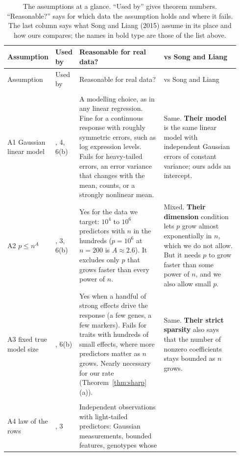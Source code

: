 \documentclass[11pt]{article}
\theoremstyle{plain}
\theoremstyle{definition}
\begin{document}
{\footnotesize\setlength{\tabcolsep}{3.5pt}\renewcommand{\arraystretch}{1.1}
\begin{longtable}{@{}>{\raggedright\arraybackslash}p{0.125\linewidth}>{\raggedright\arraybackslash}p{0.06\linewidth}>{\raggedright\arraybackslash}p{0.385\linewidth}>{\raggedright\arraybackslash}p{0.375\linewidth}@{}}
\caption{The assumptions at a glance. ``Used by'' gives theorem numbers. ``Reasonable?'' says for which data the
assumption holds and where it fails. The last column says what Song and Liang (2015) assume in its place and how ours
compares; the names in bold type are those of the list above.}\label{tab:assumptions}\\
\toprule
Assumption & Used by & Reasonable for real data? & vs Song and Liang \\
\midrule
\endfirsthead
\toprule
Assumption & Used by & Reasonable for real data? & vs Song and Liang \\
\midrule
\endhead
\multicolumn{4}{@{}l}{\textbf{The data model}} \\
A1 Gaussian linear model & 1, 4, 6(b) &
A modelling choice, as in any linear regression. Fine for a continuous response with roughly symmetric errors, such as
log expression levels. Fails for heavy-tailed errors, an error variance that changes with the mean, counts, or a
strongly nonlinear mean. &
Same. \textbf{Their model} is the same linear model with independent Gaussian errors of constant variance; ours adds
an intercept. \\
A2 $p\le n^A$ & 1, 3, 6(b) &
Yes for the data we target: $10^4$ to $10^6$ predictors with $n$ in the hundreds ($p=10^6$ at $n=200$ is
$A\approx2.6$). It excludes only $p$ that grows faster than every power of $n$. &
Mixed. \textbf{Their dimension} condition lets $p$ grow almost exponentially in $n$, which we do not allow. But it
needs $p$ to grow faster than some power of $n$, and we also allow small $p$. \\
A3 fixed true model size & 1, 6(b) &
Yes when a handful of strong effects drive the response (a few genes, a few markers). Fails for traits with hundreds
of small effects, where more predictors matter as $n$ grows. Nearly necessary for our rate (Theorem~\ref{thm:sharp}(a)). &
Same. \textbf{Their strict sparsity} also says that the number of nonzero coefficients stays bounded as $n$ grows. \\
\midrule
\multicolumn{4}{@{}l}{\textbf{The predictors and the signal}} \\
A4 law of the rows & 1, 3 &
Independent observations with light-tailed predictors: Gaussian measurements, bounded features, genotypes whose

\end{longtable}}
\end{document}
